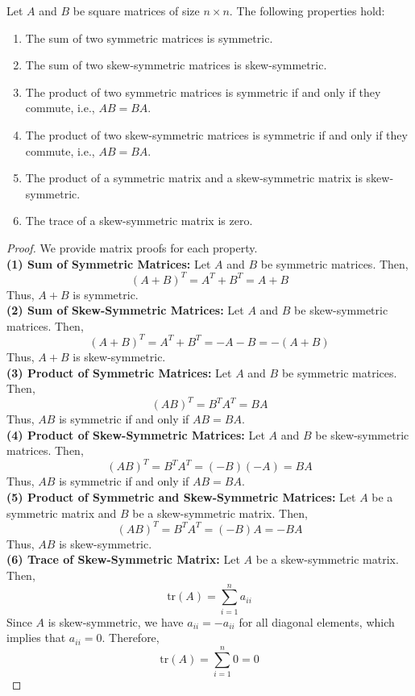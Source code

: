 \documentclass[openany]{book}
\begin{document}
\begin{mytheorem}
Let $A$ and $B$ be square matrices of size $n \times n$. The following properties hold:
\begin{enumerate}
    \item The sum of two symmetric matrices is symmetric.
    \item The sum of two skew-symmetric matrices is skew-symmetric.
    \item The product of two symmetric matrices is symmetric if and only if they commute, i.e., $AB = BA$.
    \item The product of two skew-symmetric matrices is symmetric if and only if they commute, i.e., $AB = BA$.
    \item The product of a symmetric matrix and a skew-symmetric matrix is skew-symmetric.
    \item The trace of a skew-symmetric matrix is zero.
\end{enumerate}
\end{mytheorem}
\begin{proof}
    We provide matrix proofs for each property. \\
    \textbf{(1) Sum of Symmetric Matrices:} Let $A$ and $B$ be symmetric matrices. Then,
    \[
    (A + B)^T = A^T + B^T = A + B
    \]
    Thus, $A + B$ is symmetric. \\
    \textbf{(2) Sum of Skew-Symmetric Matrices:} Let $A$ and $B$ be skew-symmetric matrices. Then,
    \[
    (A + B)^T = A^T + B^T = -A - B = -(A + B)
    \]
    Thus, $A + B$ is skew-symmetric. \\
    \textbf{(3) Product of Symmetric Matrices:} Let $A$ and $B$ be symmetric matrices. Then,
    \[
    (AB)^T = B^T A^T = BA
    \]
    Thus, $AB$ is symmetric if and only if $AB = BA$. \\
    \textbf{(4) Product of Skew-Symmetric Matrices:} Let $A$ and $B$ be skew-symmetric matrices. Then,
    \[
    (AB)^T = B^T A^T = (-B)(-A) = BA
    \]
    Thus, $AB$ is symmetric if and only if $AB = BA$. \\
    \textbf{(5) Product of Symmetric and Skew-Symmetric Matrices:} Let $A$ be a symmetric matrix and $B$ be a skew-symmetric matrix. Then,
    \[
    (AB)^T = B^T A^T = (-B)A = -BA
    \]
    Thus, $AB$ is skew-symmetric. \\
    \textbf{(6) Trace of Skew-Symmetric Matrix:} Let $A$ be a skew-symmetric matrix. Then,
    \[
    \text{tr}(A) = \sum_{i=1}^{n} a_{ii}
    \]
    Since $A$ is skew-symmetric, we have $a_{ii} = -a_{ii}$ for all diagonal elements, which implies that $a_{ii} = 0$. Therefore,
    \[
    \text{tr}(A) = \sum_{i=1}^{n} 0 = 0
    \]
\end{proof} 
\end{document}
